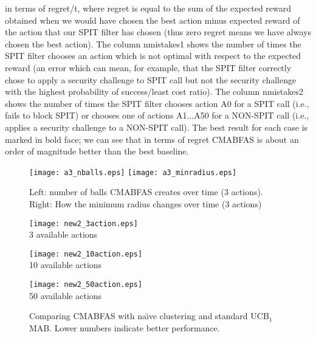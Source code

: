 \documentclass{llncs}
\begin{document}
\begin{sidewaystable}
{in terms of regret/t, where regret is equal to the sum of the expected reward obtained when we would have chosen the best action minus expected
reward of the action that our SPIT filter has chosen (thus zero regret means we have always chosen the best action). The column nmistakes1 shows
the number of times the SPIT filter chooses an action which is not optimal with respect to the expected reward (an error which can mean, for example, that the SPIT filter correctly chose to apply a security challenge to SPIT call but not the security challenge with the highest probability of success/least cost ratio). The column nmistakes2 shows the number of times the SPIT filter 
chooses action A0 for a SPIT call (i.e., fails to block SPIT) or chooses one of actions A1$\ldots$A50 for a NON-SPIT call (i.e., applies
a security challenge to a NON-SPIT call). The best result for each case is marked in bold face; we can see that in terms of regret CMABFAS is about an
order of magnitude better than the best baseline.}
\label{tab:results}
\end{sidewaystable}


\begin{figure}[!t]
\centerline{
\texttt{[image: a3\_nballs.eps]}
\texttt{[image: a3\_minradius.eps]}
}
\caption{Left: number of balls CMABFAS creates over time (3 actions). 
Right: How the minimum radius changes over time (3 actions) }
\label{fig:nballs}
\end{figure}



\begin{figure}[!t]
\begin{center}
\begin{minipage}{0.32\textwidth}
\begin{center}
		\texttt{[image: new2\_3action.eps]}\\
	
	{\small 3 available actions}
	\end{center}
\end{minipage}
\begin{minipage}{0.32\textwidth}
\begin{center}
		\texttt{[image: new2\_10action.eps]}\\
		
		{\small 10 available actions}
\end{center}
\end{minipage}
\begin{minipage}{0.32\textwidth}
\begin{center}
		\texttt{[image: new2\_50action.eps]}\\
		
		{\small 50 available actions}
\end{center}		
\end{minipage}

\end{center}
\caption{
 Comparing CMABFAS with na\"{\i}ve clustering and standard UCB$_1$ MAB. Lower numbers indicate better performance.}
\label{fig:results}
\end{figure}
\end{document}
